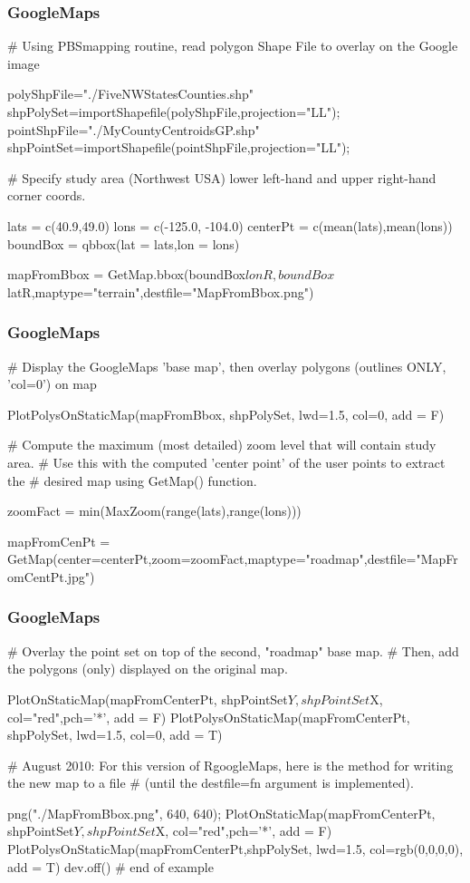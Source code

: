 \documentclass{beamer}
\begin{document}
\begin{frame}[fragile]
\frametitle{GoogleMaps}

# Using PBSmapping routine, read polygon Shape File to overlay on the Google image

   polyShpFile="./FiveNWStatesCounties.shp"
   shpPolySet=importShapefile(polyShpFile,projection="LL");
   pointShpFile="./MyCountyCentroidsGP.shp"
   shpPointSet=importShapefile(pointShpFile,projection="LL");

# Specify study area (Northwest USA) lower left-hand and upper right-hand corner coords.

   lats = c(40.9,49.0)
   lons = c(-125.0, -104.0)
   centerPt = c(mean(lats),mean(lons))
   boundBox = qbbox(lat = lats,lon = lons)

   mapFromBbox = GetMap.bbox(boundBox$lonR,boundBox$latR,maptype="terrain",destfile="MapFromBbox.png")
\end{frame}
\begin{frame}[fragile]
\frametitle{GoogleMaps}
   
# Display the GoogleMaps 'base map', then overlay polygons (outlines ONLY, 'col=0') on map
   
   PlotPolysOnStaticMap(mapFromBbox, shpPolySet, lwd=1.5, col=0, add = F)

# Compute the maximum (most detailed) zoom level that will contain study area.
# Use this with the computed 'center point' of the user points to extract the
# desired map using GetMap() function.

   zoomFact = min(MaxZoom(range(lats),range(lons)))
   
   mapFromCenPt = GetMap(center=centerPt,zoom=zoomFact,maptype="roadmap",destfile="MapFromCentPt.jpg")
\end{frame}
\begin{frame}[fragile]
\frametitle{GoogleMaps}

# Overlay the point set on top of the second, "roadmap" base map.
# Then, add the polygons (only) displayed on the original map.

   PlotOnStaticMap(mapFromCenterPt, shpPointSet$Y,shpPointSet$X, col="red",pch='*', add = F)
   PlotPolysOnStaticMap(mapFromCenterPt, shpPolySet, lwd=1.5, col=0, add = T)

# August 2010: For this version of RgoogleMaps, here is the method for writing the new map to a file
# (until the destfile=fn argument is implemented).
   
   png("./MapFromBbox.png", 640, 640);
   PlotOnStaticMap(mapFromCenterPt, shpPointSet$Y,shpPointSet$X, col="red",pch='*', add = F)
   PlotPolysOnStaticMap(mapFromCenterPt,shpPolySet, lwd=1.5, col=rgb(0,0,0,0), add = T)
   dev.off() # end of example
\end{frame}
\end{document}

